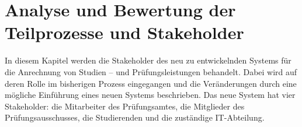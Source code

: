 \section{Analyse und Bewertung der Teilprozesse und Stakeholder}

In diesem Kapitel werden die Stakeholder des neu zu entwickelnden Systems für die Anrechnung von Studien – und Prüfungsleistungen behandelt. Dabei wird auf deren Rolle im bisherigen Prozess eingegangen und die Veränderungen durch eine mögliche Einführung eines neuen Systems beschrieben. Das neue System hat vier Stakeholder: die Mitarbeiter des Prüfungsamtes, die Mitglieder des Prüfungsausschusses, die Studierenden und die zuständige IT-Abteilung.







